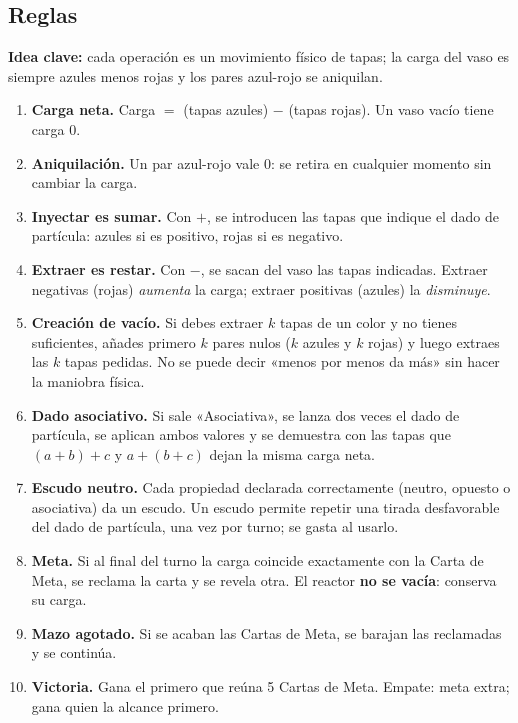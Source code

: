 \documentclass[12pt, letterpaper]{article}
\begin{document}
\subsection{Reglas}

\textbf{Idea clave:} cada operación es un movimiento físico de tapas; la carga del vaso es siempre azules menos rojas y los pares azul-rojo se aniquilan.

\begin{enumerate}[leftmargin=*]
  \item \textbf{Carga neta.} Carga $=$ (tapas azules) $-$ (tapas rojas). Un vaso vacío tiene carga $0$.
  \item \textbf{Aniquilación.} Un par azul-rojo vale $0$: se retira en cualquier momento sin cambiar la carga.
  \item \textbf{Inyectar es sumar.} Con $+$, se introducen las tapas que indique el dado de partícula: azules si es positivo, rojas si es negativo.
  \item \textbf{Extraer es restar.} Con $-$, se sacan del vaso las tapas indicadas. Extraer negativas (rojas) \emph{aumenta} la carga; extraer positivas (azules) la \emph{disminuye}.
  \item \textbf{Creación de vacío.} Si debes extraer $k$ tapas de un color y no tienes suficientes, añades primero $k$ pares nulos ($k$ azules y $k$ rojas) y luego extraes las $k$ tapas pedidas. No se puede decir «menos por menos da más» sin hacer la maniobra física.
  \item \textbf{Dado asociativo.} Si sale «Asociativa», se lanza dos veces el dado de partícula, se aplican ambos valores y se demuestra con las tapas que $(a+b)+c$ y $a+(b+c)$ dejan la misma carga neta.
  \item \textbf{Escudo neutro.} Cada propiedad declarada correctamente (neutro, opuesto o asociativa) da un escudo. Un escudo permite repetir una tirada desfavorable del dado de partícula, una vez por turno; se gasta al usarlo.
  \item \textbf{Meta.} Si al final del turno la carga coincide exactamente con la Carta de Meta, se reclama la carta y se revela otra. El reactor \textbf{no se vacía}: conserva su carga.
  \item \textbf{Mazo agotado.} Si se acaban las Cartas de Meta, se barajan las reclamadas y se continúa.
  \item \textbf{Victoria.} Gana el primero que reúna 5 Cartas de Meta. Empate: meta extra; gana quien la alcance primero.
\end{enumerate}
\end{document}
